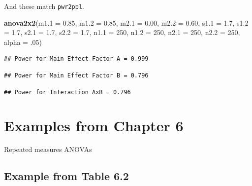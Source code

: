 \documentclass[]{book}
\newenvironment{Shaded}{\begin{snugshade}}{\end{snugshade}}
\newcommand{\DataTypeTok}[1]{\textcolor[rgb]{0.13,0.29,0.53}{#1}}
\newcommand{\DecValTok}[1]{\textcolor[rgb]{0.00,0.00,0.81}{#1}}
\newcommand{\FloatTok}[1]{\textcolor[rgb]{0.00,0.00,0.81}{#1}}
\newcommand{\KeywordTok}[1]{\textcolor[rgb]{0.13,0.29,0.53}{\textbf{#1}}}
\newcommand{\NormalTok}[1]{#1}
\begin{document}
And these match \texttt{pwr2ppl}.

\begin{Shaded}
\begin{Highlighting}[]
\KeywordTok{anova2x2}\NormalTok{(}\DataTypeTok{m1.1 =} \FloatTok{0.85}\NormalTok{, }\DataTypeTok{m1.2 =} \FloatTok{0.85}\NormalTok{, }\DataTypeTok{m2.1 =} \FloatTok{0.00}\NormalTok{, }\DataTypeTok{m2.2 =} \FloatTok{0.60}\NormalTok{,}
         \DataTypeTok{s1.1 =} \FloatTok{1.7}\NormalTok{, }\DataTypeTok{s1.2 =} \FloatTok{1.7}\NormalTok{, }\DataTypeTok{s2.1 =} \FloatTok{1.7}\NormalTok{, }\DataTypeTok{s2.2 =} \FloatTok{1.7}\NormalTok{,}
         \DataTypeTok{n1.1 =} \DecValTok{250}\NormalTok{, }\DataTypeTok{n1.2 =} \DecValTok{250}\NormalTok{, }\DataTypeTok{n2.1 =} \DecValTok{250}\NormalTok{, }\DataTypeTok{n2.2 =} \DecValTok{250}\NormalTok{,}
         \DataTypeTok{alpha =} \FloatTok{.05}\NormalTok{)}
\end{Highlighting}
\end{Shaded}

\begin{verbatim}
## Power for Main Effect Factor A = 0.999
\end{verbatim}

\begin{verbatim}
## Power for Main Effect Factor B = 0.796
\end{verbatim}

\begin{verbatim}
## Power for Interaction AxB = 0.796
\end{verbatim}

\hypertarget{examples-from-chapter-6}{%
\section{Examples from Chapter 6}\label{examples-from-chapter-6}}

Repeated measures ANOVAs

\hypertarget{example-from-table-6.2}{%
\subsection{Example from Table 6.2}\label{example-from-table-6.2}}
\end{document}
